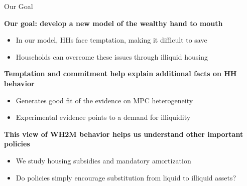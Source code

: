 \documentclass[10pt,english,t,10pt]{beamer}
\begin{document}
\begin{frame} {Our Goal} \label{question}
\bigskip


{\bf Our goal: develop a new model of the wealthy hand to mouth }

\begin{itemize}

\item In our model, HHs face temptation, making it difficult to save

\item Households can overcome these issues through illiquid housing
\end{itemize}

\pause
{\bf Temptation and commitment help explain additional facts on HH behavior}

\begin{itemize}

\item Generates good fit of the evidence on MPC heterogeneity
 
\item Experimental evidence points to a demand for illiquidity

\end{itemize}


\pause
{\bf This view of WH2M behavior helps us understand other important policies} %

\begin{itemize}

\item We study housing subsidies and mandatory amortization %

\item Do policies simply encourage substitution from liquid to illiquid assets? 
\
\end{itemize}
\end{frame}
\end{document}
